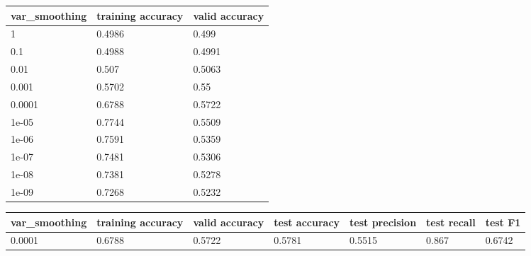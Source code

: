 \documentclass{article}%
\begin{document}
%
\normalsize%
\begin{longtable}{l l l}%
\hline%
var\_smoothing&training accuracy&valid accuracy\\%
\hline%
\endhead%
\hline%
1&0.4986&0.499\\%
0.1&0.4988&0.4991\\%
0.01&0.507&0.5063\\%
0.001&0.5702&0.55\\%
0.0001&0.6788&0.5722\\%
1e{-}05&0.7744&0.5509\\%
1e{-}06&0.7591&0.5359\\%
1e{-}07&0.7481&0.5306\\%
1e{-}08&0.7381&0.5278\\%
1e{-}09&0.7268&0.5232\\%
\hline%
\end{longtable}%
\begin{longtable}{l l l l l l l}%
\hline%
var\_smoothing&training accuracy&valid accuracy&test accuracy&test precision&test recall&test F1\\%
\hline%
\endhead%
\hline%
0.0001&0.6788&0.5722&0.5781&0.5515&0.867&0.6742\\%
\hline%
\end{longtable}%
\end{document}
